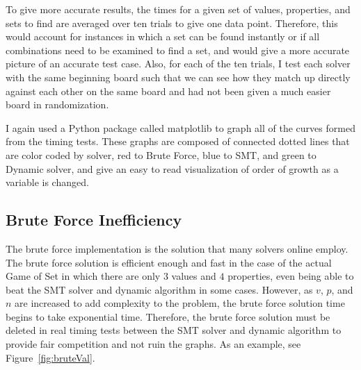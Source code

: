 \documentclass[pageno]{jpaper}
\begin{document}
To give more accurate results, the times for a given set of values, properties, and sets to find are averaged over ten trials to give one data point. Therefore, this would account for instances in which a set can be found instantly or if all combinations need to be examined to find a set, and would give a more accurate picture of an accurate test case. Also, for each of the ten trials, I test each solver with the same beginning board such that we can see how they match up directly against each other on the same board and had not been given a much easier board in randomization. 

I again used a Python package called matplotlib to graph all of the curves formed from the timing tests. These graphs are composed of connected dotted lines that are color coded by solver, red to Brute Force, blue to SMT, and green to Dynamic solver, and give an easy to read visualization of order of growth as a variable is changed. 


\subsection{Brute Force Inefficiency}

The brute force implementation is the solution that many solvers online employ. The brute force solution is efficient enough and fast in the case of the actual Game of Set in which there are only $3$ values and $4$ properties, even being able to beat the SMT solver and dynamic algorithm in some cases. However, as $v$, $p$, and $n$ are increased to add complexity to the problem, the brute force solution time begins to take exponential time. Therefore, the brute force solution must be deleted in real timing tests between the SMT solver and dynamic algorithm to provide fair competition and not ruin the graphs. As an example, see Figure~\ref{fig:bruteVal}.
\end{document}
